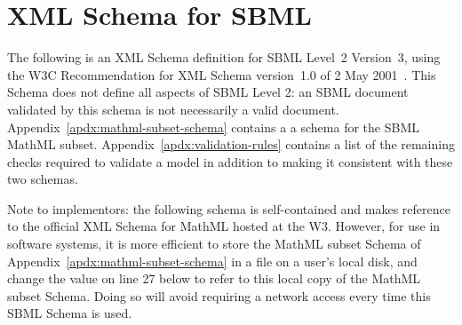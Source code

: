 
\section{XML Schema for SBML}
\label{apdx:schema}

The following is an XML Schema definition for SBML Level~2 Version~3, using
the W3C Recommendation for XML Schema version~1.0 of 2 May
2001~\citep{biron:2000,fallside:2000,thompson:2000}.  This Schema
does not define all aspects of SBML Level 2: an SBML document
validated by this schema is not necessarily a valid \sbmltwo
document.  Appendix~\ref{apdx:mathml-subset-schema} contains a a
schema for the SBML MathML subset.
Appendix~\ref{apdx:validation-rules} contains a list of the
remaining checks required to validate a model in addition
to making it consistent with these two schemas.

Note to implementors: the following schema is
self-contained and makes reference to the official XML Schema for
MathML hosted at the W3.  However, for use in software systems, it
is more efficient to store the MathML subset Schema of
Appendix~\ref{apdx:mathml-subset-schema} in a file on a user's
local disk, and change the  value on line 27
below to refer to this local copy of the MathML subset Schema.
Doing so will avoid requiring a network access every time this
SBML Schema is used.

\begin{example}
\begin{footnotesize}

\end{footnotesize}
\end{example}

